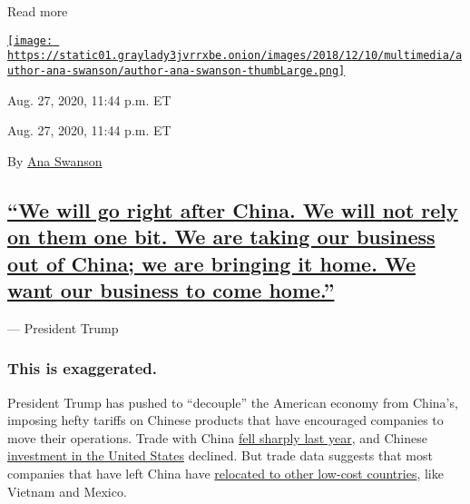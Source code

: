 Read more

\href{https://www.nytimes3xbfgragh.onion/by/ana-swanson}{\texttt{[image: https://static01.graylady3jvrrxbe.onion/images/2018/12/10/multimedia/author-ana-swanson/author-ana-swanson-thumbLarge.png]}}

Aug. 27, 2020, 11:44 p.m. ET

Aug. 27, 2020, 11:44 p.m. ET

By \href{https://www.nytimes3xbfgragh.onion/by/ana-swanson}{Ana Swanson}

\hypertarget{we-will-go-right-after-china-we-will-not-rely-on-them-one-bit-we-are-taking-our-business-out-of-china-we-are-bringing-it-home-we-want-our-business-to-come-home}{%
\subsection{\texorpdfstring{\protect\hyperlink{we-will-go-right-after-china-we-will-not-rely-on-them-one-bit-we-are-taking-our-business-out-of-china-we-are-bringing-it-home-we}{``We
will go right after China. We will not rely on them one bit. We are
taking our business out of China; we are bringing it home. We want our
business to come
home.''}}{``We will go right after China. We will not rely on them one bit. We are taking our business out of China; we are bringing it home. We want our business to come home.''}}\label{we-will-go-right-after-china-we-will-not-rely-on-them-one-bit-we-are-taking-our-business-out-of-china-we-are-bringing-it-home-we-want-our-business-to-come-home}}

--- President Trump

\hypertarget{this-is-exaggerated-}{%
\subsubsection{This is exaggerated. }\label{this-is-exaggerated-}}

President Trump has pushed to ``decouple'' the American economy from
China's, imposing hefty tariffs on Chinese products that have encouraged
companies to move their operations. Trade with China
\href{https://www.nytimes3xbfgragh.onion/2020/02/05/business/economy/trump-trade.html}{fell
sharply last year}, and Chinese
\href{https://rhg.com/research/two-way-street-us-china-investment-trends-2020-update/}{investment
in the United States} declined. But trade data suggests that most
companies that have left China have
\href{https://www.nytimes3xbfgragh.onion/2020/02/05/business/economy/trump-trade.html}{relocated
to other low-cost countries}, like Vietnam and Mexico.

